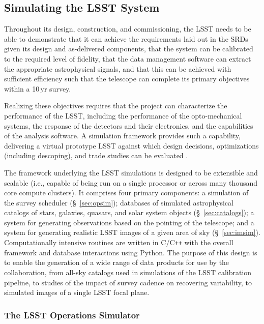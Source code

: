 \subsection{Simulating the LSST System}

Throughout its design, construction, and commissioning, the LSST needs
to be able to demonstrate that it can achieve the requirements laid out
in the SRDs given its design and
as-delivered components, that the system can be calibrated to the
required level of fidelity, that the data management software can
extract the appropriate astrophysical signals, and that this can be
achieved with sufficient efficiency such that the telescope can
complete its primary objectives within a 10\,yr survey.


Realizing these objectives requires that the project can characterize
the performance of the LSST, including the performance of the
opto-mechanical systems, the response of the detectors and their
electronics, and the capabilities of the analysis software. A
simulation framework provides such a capability, delivering a virtual
prototype LSST against which design decisions, optimizations
(including descoping), and trade studies can be evaluated \citep{2014SPIE.9150E..14C}.


The framework underlying the LSST simulations is designed to be
extensible and scalable (i.e., capable of being run on a single
processor or across many thousand core compute clusters). It comprises
four primary components: a simulation of the survey scheduler
(\S~\ref{sec:opsim});
databases of simulated astrophysical catalogs of stars, galaxies,
quasars, and solar system objects (\S~\ref{sec:catalogs}); a system for generating observations
based on the pointing of the telescope; and a system for generating
realistic LSST images of a given area of sky
(\S~\ref{sec:imsim}). Computationally intensive routines are written
in C/C\texttt{++} with the overall framework and database interactions
using Python.  The purpose of this design is to enable the
generation of a wide range of data products for use by the
collaboration, from all-sky catalogs used in simulations of the LSST
calibration pipeline, to studies of the impact of survey cadence on
recovering variability, to simulated images of a single LSST focal
plane.


\subsubsection{The LSST Operations Simulator \label{sec:opsim}}

